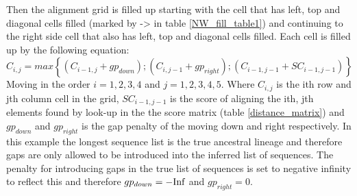 Then the alignment grid is filled up starting with the cell that has left, top and diagonal cells filled (marked by -> in table \ref{NW_fill_table1}) and continuing to the right side cell that also has left, top and diagonal cells filled.
Each cell is filled up by the following equation:
$$
C_{i,j} = max\left\{ (C_{i-1,j} + gp_{down}); (C_{i,j-1} + gp_{right}); (C_{i-1,j-1} + SC_{i-1,j-1})  \right\}
$$
Moving in the order $i=1,2,3,4$ and $j=1,2,3,4,5$. Where $C_{i,j}$ is the ith row and jth column cell in the grid, $SC_{i-1,j-1}$ is the score of aligning the ith, jth elements found by look-up in the the score matrix (table \ref{distance_matrix}) and $gp_{down}$ and $gp_{right}$ is the gap penalty of the moving down and right respectively.
In this example the longest sequence list is the true ancestral lineage and therefore gaps are only allowed to be introduced into the inferred list of sequences.
The penalty for introducing gaps in the true list of sequences is set to negative infinity to reflect this and therefore $gp_{down} = -\text{Inf}$ and $gp_{right} = 0$.

